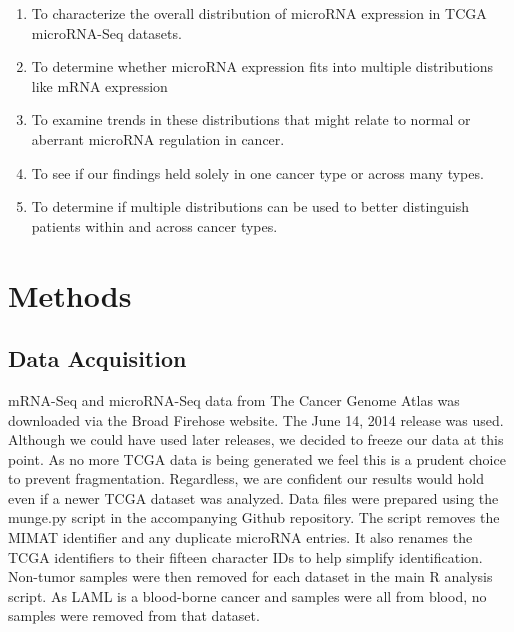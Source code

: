 \documentclass[12pt]{report}
\begin{document}
\begin{enumerate}
  \item To characterize the overall distribution of microRNA expression in TCGA 
  microRNA-Seq datasets.
  \item To determine whether microRNA expression fits into multiple 
  distributions like mRNA expression
  \item To examine trends in these distributions that might relate to normal or aberrant microRNA 
  regulation in cancer.
  \item To see if our findings held solely in one cancer type or across many 
  types.
  \item To determine if multiple distributions can be used to better distinguish 
  patients within and across cancer types.
\end{enumerate}



\section*{Methods}
\subsection*{Data Acquisition}
mRNA-Seq and microRNA-Seq data from The Cancer Genome Atlas was downloaded via the Broad Firehose website.
The June 14, 2014 release was used. Although we could have used later releases, we decided to freeze our data at this point. As no more
TCGA data is being generated we feel this is a prudent choice to prevent fragmentation. Regardless, we are confident our results would hold
even if a newer TCGA dataset was analyzed. Data files were prepared using the munge.py script in the accompanying Github repository. The script
removes the MIMAT identifier and any duplicate microRNA entries. It also renames the TCGA identifiers to their fifteen character IDs to help
simplify identification. Non-tumor samples were then removed for each dataset in the main R analysis script. As LAML is a blood-borne cancer and samples were all from blood,
no samples were removed from that dataset.



\end{document}
